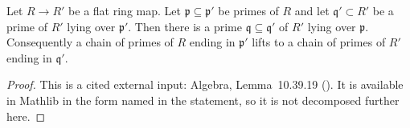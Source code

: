 \begin{lemma}
\label{lem:pc-going-down-flat}
Let $R\to R'$ be a flat ring map.  Let $\mathfrak p\subseteq\mathfrak
p'$ be primes of $R$ and let $\mathfrak q'\subset R'$ be a prime of
$R'$ lying over $\mathfrak p'$.  Then there is a prime
$\mathfrak q\subseteq\mathfrak q'$ of $R'$ lying over $\mathfrak p$.
Consequently a chain of primes of $R$ ending in $\mathfrak p'$ lifts to
a chain of primes of $R'$ ending in $\mathfrak q'$.
\mathlibok\ 
\end{lemma}
\begin{proof}
This is a cited external input: Algebra, Lemma~10.39.19
().  It is available in Mathlib in the form named in
the statement, so it is not decomposed further here.
\end{proof}

